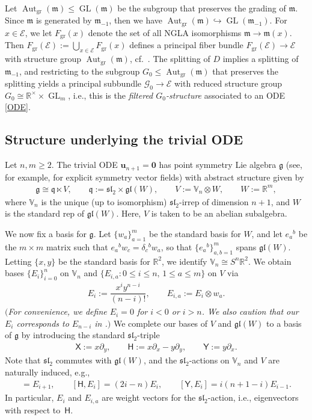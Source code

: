 \documentclass[10pt,a4paper]{amsart}
\newcommand\tensor{\otimes}
\DeclareMathOperator{\gr}{gr}
\DeclareMathOperator{\aut}{Aut}
\newcommand\GL{\operatorname{GL}}
\newcommand{\g}{\mathfrak{g}}
\newcommand{\gl}{\mathfrak{gl}}
\newcommand\bu{\mathbf{u}}
\newcommand\cG{\mathcal{G}}
\renewcommand\gr{\operatorname{gr}}
\newcommand\fg{\mathfrak{g}}
\newcommand\fsl{\mathfrak{sl}}
\newcommand\fm {\mathfrak{m}}
\newcommand\fq {\mathfrak{q}}
\newcommand{\R}{\mathbb{R}}
\newcommand{\V}{\mathbb{V}}
\newcommand\sfX{\mathsf{X}}
\newcommand\sfH{\mathsf{H}}
\newcommand\sfY{\mathsf{Y}}
\newcommand\cE{\mathcal{E}}
\numberwithin{equation}{section}
\begin{document}
Let $\aut_{\gr}(\fm) \le \GL(\fm)$ be the subgroup that preserves the grading of $\fm$. Since $\fm $ is generated by $\fm_{-1}$, then we have $\aut_{\gr}(\mathfrak{m}) \hookrightarrow\GL(\fm_{-1})$. For $x \in \cE$, we let $F_{\gr}(x)$ denote the set of all NGLA isomorphisms $\mathfrak{m} \to \mathfrak{m}(x)$. Then $F_{\gr}(\cE) := \bigcup_{x \in \cE} F_{\gr}(x)$ defines a principal fiber bundle $F_{\gr}(\cE) \to \cE$ with structure group $\aut_{\gr}(\fm)$, cf.\ \cite[Proposition~2.1]{Andreas2017}. The splitting of $D$ implies a splitting of $\fm_{-1}$, and restricting to the subgroup $G_0 \leq \aut_{\gr}(\fm)$ that preserves the splitting yields a principal subbundle $\cG_0 \to \cE$ with reduced structure group $G_0 \cong \R^{\times} \times \GL_m$, i.e., this is the {\em filtered $G_0$-structure} associated to an ODE \eqref{ODE}.

\subsection{Structure underlying the trivial ODE}\label{S:FM}

Let $n,m \geq 2$. The trivial ODE $\bu_{n+1} =\mathbf{0}$ has point symmetry Lie algebra $\g$ (see, for example, \cite[Section~2.2]{CDT2020} for explicit symmetry vector fields) with abstract structure given by
 \begin{align*}
 \g \cong \fq \ltimes V, \qquad
 \fq :=\fsl_2 \times \gl(W), \qquad
 V:= \V_n \tensor W, \qquad
 W :=\R^m,
 \end{align*}
where $\V_n$ is the unique (up to isomorphism) $\fsl_2$-irrep of dimension $n+1$, and $W$ is the standard rep of $\gl(W)$. Here, $V$ is taken to be an abelian subalgebra.

We now fix a basis for $\g$. Let $\{ w_a \}_{a=1}^m$ be the standard basis for $W$, and let $e_a{}^b$ be the $m \times m$ matrix such that $e_a{}^b w_c = \delta_c{}^b w_a$, so that $\bigl\{e_a{}^b\bigr\}_{a,b=1}^m$ spans $\gl(W)$.
Letting $\{x, y\}$ be the standard basis for $\R^2$, we identify $\V_n \cong S^n \R^2$. We obtain bases $\{ E_i \}_{i=0}^n$ on $\V_n$ and $\{ E_{i,a}\colon 0 \leq i \leq n, \, 1 \leq a \leq m \}$ on $V$ via
\begin{align*}
E_i := \dfrac{x^i y^{n-i}}{(n-i)!}, \qquad
E_{i,a} := E_i \otimes w_a.
\end{align*}
$(${\em For convenience, we define $E_i = 0$ for $i < 0$ or $i > n$. We also caution that our $E_i$ corresponds to $E_{n-i}$ in {\rm \cite[{\em Section}~2.1.2]{KT2021}.}}$)$ We complete our bases of $V$ and $\gl(W)$ to a basis of $\fg$ by introducing the standard $\fsl_2$-triple
 \begin{align*}
 \sfX := x\partial_y, \qquad
 \sfH := x\partial_x-y\partial_y, \qquad
 \sfY := y\partial_x.
 \end{align*}
Note that $\fsl_2$ commutes with $\gl(W)$, and the $\fsl_2$-actions on $\V_n$ and $V$ are naturally induced, e.g.,
 \begin{align*}
 [\sfX, E_i] = E_{i+1},\qquad
 [\sfH, E_i] = (2i-n) E_{i}, \qquad
 [\sfY, E_i] = i(n+1-i) E_{i-1}.
 \end{align*}
 In particular, $E_i$ and $E_{i,a}$ are weight vectors for the $\fsl_2$-action, i.e., eigenvectors with respect to~$\sfH$.
\end{document}
